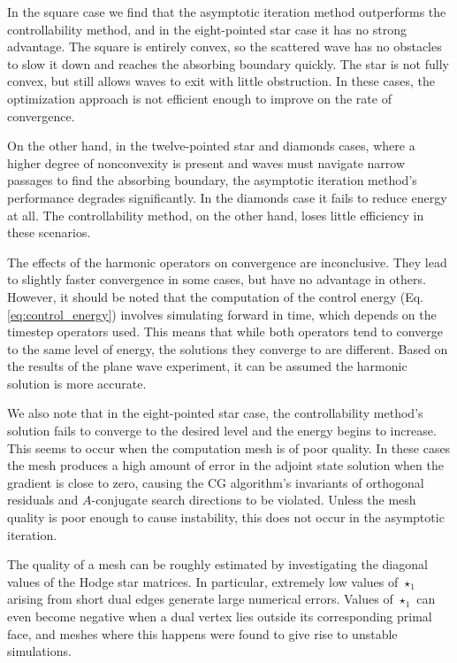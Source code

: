 \documentclass[utf8,english]{gradu3}
\begin{document}
In the square case we find that the asymptotic iteration method
outperforms the controllability method,
and in the eight-pointed star case it has no strong advantage.
The square is entirely convex, so the scattered wave has no obstacles to slow it down
and reaches the absorbing boundary quickly.
The star is not fully convex, but still allows waves to exit with little obstruction.
In these cases, the optimization approach is not efficient enough
to improve on the rate of convergence.

On the other hand, in the twelve-pointed star and diamonds cases,
where a higher degree of nonconvexity is present
and waves must navigate narrow passages to find the absorbing boundary,
the asymptotic iteration method's performance degrades significantly.
In the diamonds case it fails to reduce energy at all.
The controllability method, on the other hand,
loses little efficiency in these scenarios.

The effects of the harmonic operators on convergence are inconclusive.
They lead to slightly faster convergence in some cases,
but have no advantage in others.
However, it should be noted that the computation
of the control energy (Eq. \eqref{eq:control_energy})
involves simulating forward in time, which depends on the timestep operators used.
This means that while both operators tend to converge to the same level of energy,
the solutions they converge to are different.
Based on the results of the plane wave experiment,
it can be assumed the harmonic solution is more accurate.

We also note that in the eight-pointed star case, the controllability method's solution
fails to converge to the desired level and the energy begins to increase.
This seems to occur when the computation mesh is of poor quality.
In these cases the mesh produces a high amount of error in the adjoint state solution
when the gradient is close to zero,
causing the CG algorithm's invariants of orthogonal residuals
and $A$-conjugate search directions to be violated.
Unless the mesh quality is poor enough to cause instability,
this does not occur in the asymptotic iteration.

The quality of a mesh can be roughly estimated by investigating
the diagonal values of the Hodge star matrices.
In particular, extremely low values of $\star_1$
arising from short dual edges generate large numerical errors.
Values of $\star_1$ can even become negative
when a dual vertex lies outside its corresponding primal face,
and meshes where this happens were found to give rise to unstable simulations.
\end{document}
